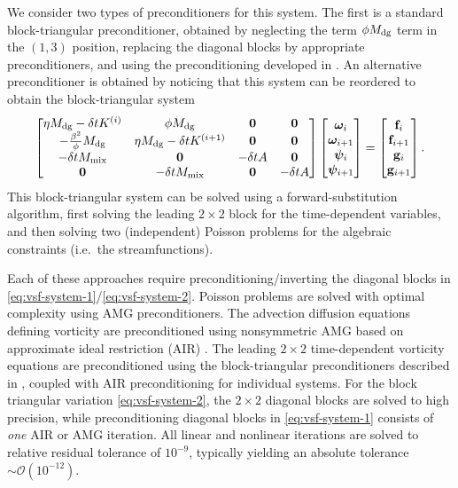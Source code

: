 \documentclass[review]{siamart}
\begin{document}
We consider two types of preconditioners for this system.
The first is a standard block-triangular preconditioner, obtained by neglecting the term $\phi M_{\rm dg}$ term in the $(1,3)$ position, replacing the diagonal blocks by appropriate preconditioners, and using the preconditioning developed in .
An alternative preconditioner is obtained by noticing that this system can be reordered to obtain the block-triangular system
\begin{align} \label{eq:vsf-system-2}
	\begin{bmatrix}
		\eta M_{\rm dg} - \delta t K^{(i)} & \phi M_{\rm dg} & \mathbf{0} & \mathbf{0} \\
		-\tfrac{\beta^2}{\phi}M_{\rm dg} & \eta M_{\rm dg} - \delta t K^{(i+1)}  & \mathbf{0}& \mathbf{0} \\
		-\delta t M_{\rm mix} & \mathbf{0} & -\delta t A & \mathbf{0} \\
		\mathbf{0} & -\delta t M_{\rm mix} & \mathbf{0} & -\delta t A
	\end{bmatrix}
	\begin{bmatrix} \bm\omega_i \\ \bm\omega_{i+1} \\ \bm\psi_i \\ \bm\psi_{i+1} \end{bmatrix}
	=
	\begin{bmatrix} \mathbf{f}_i \\ \mathbf{f}_{i+1} \\ \mathbf{g}_i \\ \mathbf{g}_{i+1} \end{bmatrix}.
\end{align}
This block-triangular system can be solved using a forward-substitution algorithm, first solving the leading $2\times2$ block for the time-dependent variables, and then solving two (independent) Poisson problems for the algebraic constraints (i.e.\ the streamfunctions).

Each of these approaches require preconditioning/inverting the diagonal blocks
in \eqref{eq:vsf-system-1}/\eqref{eq:vsf-system-2}. Poisson problems are solved
with optimal complexity using AMG preconditioners. The advection diffusion
equations defining vorticity are preconditioned using nonsymmetric AMG based on
approximate ideal restriction (AIR) \cite{Manteuffel:2019,Manteuffel:2018}. The
leading $2\times 2$ time-dependent vorticity equations are preconditioned using
the block-triangular preconditioners described in , coupled
with AIR preconditioning for individual systems. For the block triangular
variation \eqref{eq:vsf-system-2}, the $2\times2$ diagonal blocks are solved to
high precision, while preconditioning diagonal blocks in \eqref{eq:vsf-system-1}
consists of \textit{one} AIR or AMG iteration. All linear and nonlinear iterations
are solved to relative residual tolerance of $10^{-9}$, typically yielding an
absolute tolerance $\sim\mathcal{O}(10^{-12})$.
\end{document}
